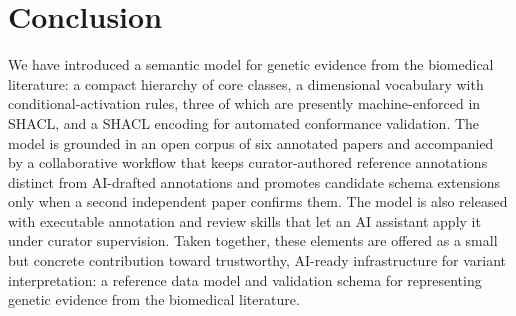 %

\section{Conclusion}
\label{sec:conclusion}

We have introduced a semantic model for genetic evidence from the
biomedical literature: a compact hierarchy of core classes, a
dimensional vocabulary with conditional-activation rules, three of
which are presently machine-enforced in SHACL, and a SHACL encoding
for automated conformance validation. The model is grounded
in an open corpus of six annotated papers and accompanied by a
collaborative workflow that keeps curator-authored reference annotations
distinct from AI-drafted annotations and promotes candidate schema
extensions only when a second independent paper confirms them. The
model is also released with executable annotation and review skills
that let an AI assistant apply it under curator supervision.
Taken together, these elements are offered as a small but concrete
contribution toward trustworthy, AI-ready infrastructure for variant
interpretation: a reference data model and validation schema for
representing genetic evidence from the biomedical literature.
